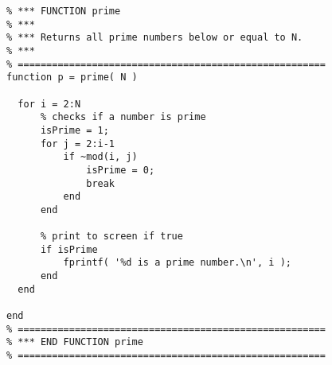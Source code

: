 \begin{lstlisting}[framerule=2pt,rulecolor=\color{goodgreen},float,caption={The same code as in listing \ref{listing:prime1}, with rules of style applied. It should now be somewhat easier to maintain and improve the code. Do you have ideas how to speed it up?}]
% ======================================================
% *** FUNCTION prime
% ***
% *** Returns all prime numbers below or equal to N.
% ***
% ======================================================
function p = prime( N )

  for i = 2:N
      % checks if a number is prime
      isPrime = 1;
      for j = 2:i-1
          if ~mod(i, j)
              isPrime = 0;
              break
          end
      end

      % print to screen if true
      if isPrime
          fprintf( '%d is a prime number.\n', i );
      end
  end

end
% ======================================================
% *** END FUNCTION prime
% ======================================================
\end{lstlisting}
